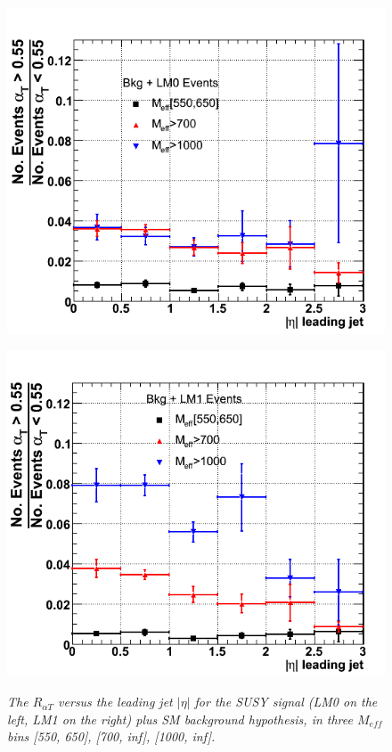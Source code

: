 \begin{figure}[h!]
\begin{minipage}[b]{0.5\linewidth}
\centering
{\label{fig:lm0_RaT}\includegraphics[scale=0.4]{./plots/Meff-NT7-Lm0-MCerr}} 
\end{minipage}
\begin{minipage}[b]{0.5\linewidth}
\centering
{\label{fig:lm1_RaT}\includegraphics[scale=0.4]{./plots/Meff-NT7-Lm1-MCerr}} 
\end{minipage}
\caption{\small{\textit{The $R_{\alpha T}$ versus the leading jet $|\eta|$ for the SUSY signal (LM0 on the left, LM1 on the right) plus SM background hypothesis, in three $M_{eff}$ bins [550, 650], [700, inf], [1000, inf].} }}
\label{fig:meff3}
\end{figure}


